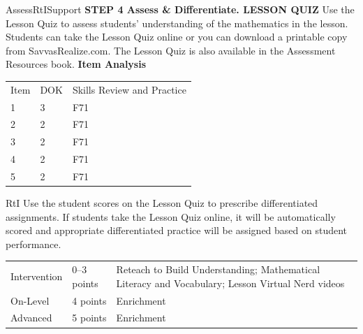 \documentclass{article}
\newenvironment{te-addendum}[2]{}{}     %
\begin{document}
\begin{te-addendum}{Assess}{RtISupport}
\textbf{STEP 4 Assess \& Differentiate. LESSON QUIZ}
Use the Lesson Quiz to assess students' understanding of the mathematics in the lesson.
Students can take the Lesson Quiz online or you can download a printable copy from SavvasRealize.com. The Lesson Quiz is also available in the Assessment Resources book.
\textbf{Item Analysis}
\begin{tabular}{lll}
Item & DOK & Skills Review and Practice \\
1 & 3 & F71 \\
2 & 2 & F71 \\
3 & 2 & F71 \\
4 & 2 & F71 \\
5 & 2 & F71 \\
\end{tabular}
RtI Use the student scores on the Lesson Quiz to prescribe differentiated assignments.
If students take the Lesson Quiz online, it will be automatically scored and appropriate differentiated practice will be assigned based on student performance.
\begin{tabular}{lll}
Intervention & 0--3 points & Reteach to Build Understanding; Mathematical Literacy and Vocabulary; Lesson Virtual Nerd videos \\
On-Level & 4 points & Enrichment \\
Advanced & 5 points & Enrichment \\
\end{tabular}
\end{te-addendum}
\end{document}
